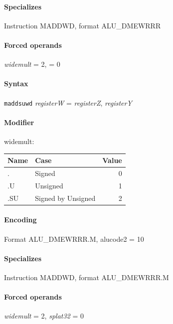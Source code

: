 {


\paragraph{Specializes} Instruction MADDWD, format ALU\_DMEWRRR

\paragraph{Forced operands} \emph{widemult} = 2, \emph{} = 0

\paragraph{Syntax} \texttt{maddsuwd} \emph{registerW} = \emph{registerZ}, \emph{registerY}

\paragraph{Modifier} \textsf{widemult}:\\

\noindent \begin{tabular}{|l|l|r|} \hline
\bf{Name} & \bf{Case} & \bf{Value} \\ \hline
. & Signed & 0 \\
.U & Unsigned & 1 \\
.SU & Signed by Unsigned & 2 \\
\hline \end{tabular}

\paragraph{Encoding} Format \textsf{ALU\_DMEWRRR.M, alucode2 = 10}\\



\paragraph{Specializes} Instruction MADDWD, format ALU\_DMEWRRR.M

\paragraph{Forced operands} \emph{widemult} = 2, \emph{splat32} = 0

}

